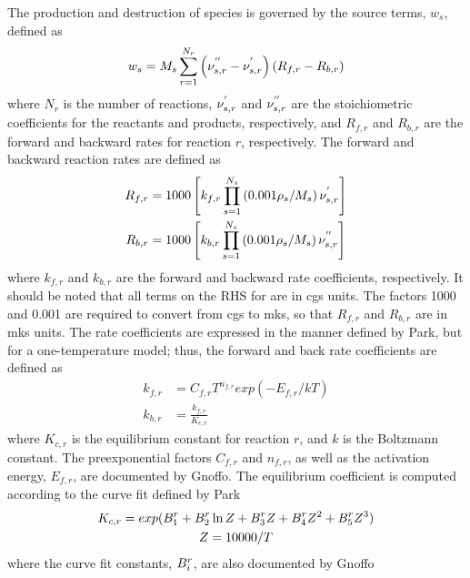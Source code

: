 The production and destruction of species is governed by the source terms,
$w_s$, defined as
\begin{equation}
  w_s = M_s \sum_{r=1}^{N_r}\left( \nu_{s,r}^{''} - \nu_{s,r}^{'} \right)
        \left( R_{f,r} - R_{b,r} \right)
  \label{source-term}
\end{equation}
where $N_r$ is the number of reactions, $\nu_{s,r}^{'}$ and $\nu_{s,r}^{''}$ are the
stoichiometric coefficients for the reactants and products, respectively, and
$R_{f,r}$ and $R_{b,r}$ are the forward and backward rates for reaction
$r$, respectively.  The forward and backward reaction rates are defined as
\begin{align}
  R_{f,r} &= 1000\left[ k_{f,r}\prod_{s=1}^{N_s}\left( 0.001\rho_s/M_s
  \right)\nu_{s,r}^{'} \right] \label{forward-rate} \\
  R_{b,r} &= 1000\left[ k_{b,r}\prod_{s=1}^{N_s}\left( 0.001\rho_s/M_s
  \right)\nu_{s,r}^{''} \right]
  \label{backward-rate}
\end{align}
where $k_{f,r}$ and $k_{b,r}$ are the forward and backward rate coefficients,
respectively.  It should be noted that all terms on the RHS for
 are in cgs units.  The factors 1000 and
0.001 are required to convert from cgs to mks, so that $R_{f,r}$ and $R_{b,r}$
are in mks units.  The rate coefficients are expressed in the manner defined by
Park\cite{park}, but for a one-temperature model; thus, the forward and back
rate coefficients are defined as
\begin{align}
  k_{f,r} &= C_{f,r}T^{n_{f,r}}exp\left( -E_{f,r}/kT \right)
  \label{forward-rate-coef} \\
  k_{b,r} &= \frac{k_{f,r}}{K_{c,r}}
  \label{backward-rate-coef}
\end{align}
where $K_{c,r}$ is the equilibrium constant for reaction $r$, and $k$ is the
Boltzmann constant.  The preexponential factors $C_{f,r}$ and $n_{f,r}$, as well
as the activation energy, $E_{f,r}$, are documented by Gnoffo\cite{gnoffo-tp}.
The equilibrium coefficient is computed according to the curve fit defined by
Park\cite{park1985convergence}
\begin{gather}
  K_{c,r} = exp(B_{1}^{r} + B_{2}^{r}\ln{Z} + B_{3}^{r}Z + B_{4}^{r}Z^2 + B_{5}^{r}Z^3) \\
  Z = 10000/T
\end{gather}
where the curve fit constants, $B_{i}^{r}$, are also documented by
Gnoffo\cite{gnoffo-tp}
